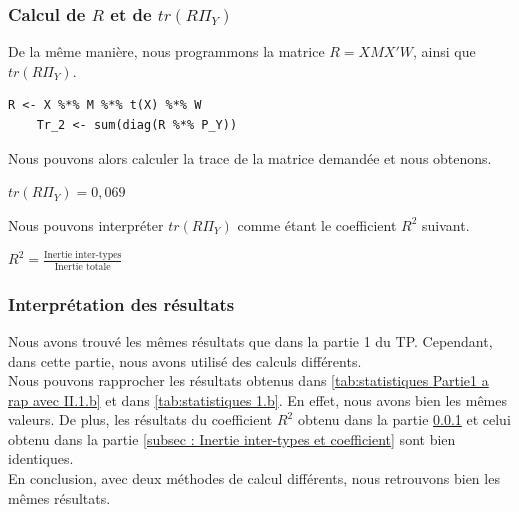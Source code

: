 \documentclass{article}
\begin{document}
\subsubsection{Calcul de $R$ et de $tr(R\Pi_Y)$ }
\label{subsec:Question 1.c}
De la même manière, nous programmons la matrice $R=XMX'W$, ainsi que $tr(R\Pi_Y)$.
\begin{lstlisting}[caption=Extrait du code R, label= Question 1c]
    R <- X %*% M %*% t(X) %*% W
    Tr_2 <- sum(diag(R %*% P_Y))
\end{lstlisting}
Nous pouvons alors calculer la trace de la matrice demandée et nous obtenons.
\begin{center}
    $tr(R\Pi_Y)=0,069$
\end{center}
Nous pouvons interpréter $tr(R\Pi_Y)$ comme étant le coefficient $R^2$ suivant.
\begin{center}
    $R^2 = \frac{\text{Inertie inter-types}}{\text{Inertie totale}}$
\end{center}
\subsubsection{Interprétation des résultats }
Nous avons trouvé les mêmes résultats que dans la partie 1 du TP. Cependant, dans cette partie, nous avons utilisé des calculs différents.\\
Nous pouvons rapprocher les résultats obtenus dans \autoref{tab:statistiques Partie1 a rap avec II.1.b} et dans \autoref{tab:statistiques 1.b}. En effet, nous avons bien
les mêmes valeurs. De plus, les résultats du coefficient $R^2$ obtenu dans la partie \ref{subsec:Question 1.c} et celui obtenu dans la partie \ref{subsec : Inertie inter-types et coefficient} sont bien identiques.
\\En conclusion, avec deux méthodes de calcul différents, nous retrouvons bien les mêmes résultats.
\end{document}
